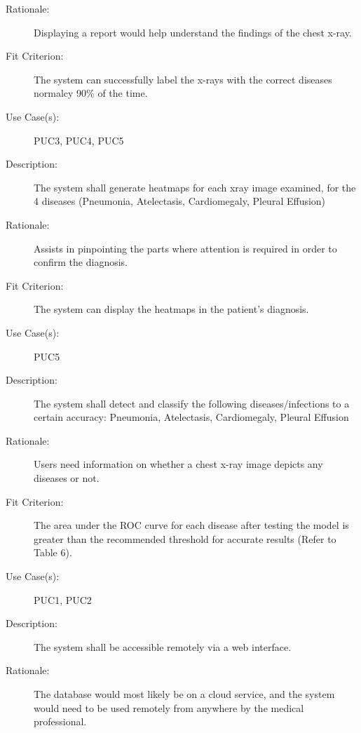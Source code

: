 \documentclass[12pt]{article}
\begin{document}
\begin{enumerate}[label=FR\arabic*., series=frs]
\begin{item}
\begin{description}
            \item[Rationale:] Displaying a report would help understand the findings of the chest x-ray.
            \item[Fit Criterion:] The system can successfully label the x-rays with the correct diseases normalcy 90\% of the time.
            \item[Use Case(s):] PUC3, PUC4, PUC5
        \end{description}
    \end{item}
    \begin{item}
        \begin{description}
            \item[Description:] The system shall generate heatmaps for each xray image examined, for the 4 diseases (Pneumonia, Atelectasis, Cardiomegaly, Pleural Effusion)
            \item[Rationale:] Assists in pinpointing the parts where attention is required in order to confirm the diagnosis.
            \item[Fit Criterion:] The system can display the heatmaps in the patient's diagnosis.
            \item[Use Case(s):] PUC5
        \end{description}
    \end{item}
    \begin{item}
        \begin{description}
            \item[Description:] \hypertarget{FR6}{The system shall detect and classify the following diseases/infections to a certain accuracy: Pneumonia, Atelectasis, Cardiomegaly, Pleural Effusion}
            \item[Rationale:] Users need information on whether a chest x-ray image depicts any diseases or not.
            \item[Fit Criterion:] The area under the ROC curve for each disease after testing the model is greater than the recommended threshold for accurate results (Refer to Table 6). 
            \item[Use Case(s):] PUC1, PUC2
        \end{description}
    \end{item}
    \begin{item}
        \begin{description}
            \item[Description:] The system shall be accessible remotely via a web interface.
            \item[Rationale:] The database would most likely be on a cloud service, and the system would need to be used remotely from anywhere by the medical professional.

\end{description}
\end{item}
\end{enumerate}
\end{document}
